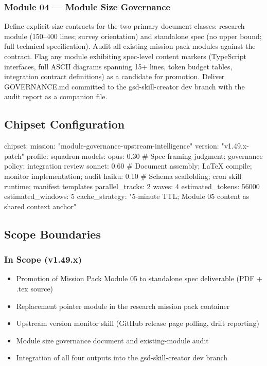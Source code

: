 \documentclass[11pt,letterpaper]{article}
\begin{document}
\subsubsection{Module 04 --- Module Size Governance}

Define explicit size contracts for the two primary document classes: research module (150--400 lines; survey orientation) and standalone spec (no upper bound; full technical specification). Audit all existing mission pack modules against the contract. Flag any module exhibiting spec-level content markers (TypeScript interfaces, full ASCII diagrams spanning 15+ lines, token budget tables, integration contract definitions) as a candidate for promotion. Deliver GOVERNANCE.md committed to the gsd-skill-creator dev branch with the audit report as a companion file.

\subsection{Chipset Configuration}

\begin{asciibox}
chipset:
  mission: "module-governance-upstream-intelligence"
  version: "v1.49.x-patch"
  profile: squadron
  models:
    opus:   0.30  # Spec framing judgment; governance policy; integration review
    sonnet: 0.60  # Document assembly; LaTeX compile; monitor implementation; audit
    haiku:  0.10  # Schema scaffolding; cron skill runtime; manifest templates
  parallel_tracks: 2
  waves: 4
  estimated_tokens: 56000
  estimated_windows: 5
  cache_strategy: "5-minute TTL; Module 05 content as shared context anchor"
\end{asciibox}

\subsection{Scope Boundaries}

\subsubsection{In Scope (v1.49.x)}
\begin{itemize}[noitemsep]
  \item Promotion of Mission Pack Module 05 to standalone spec deliverable (PDF + .tex source)
  \item Replacement pointer module in the research mission pack container
  \item Upstream version monitor skill (GitHub release page polling, drift reporting)
  \item Module size governance document and existing-module audit
  \item Integration of all four outputs into the gsd-skill-creator dev branch
\end{itemize}
\end{document}
